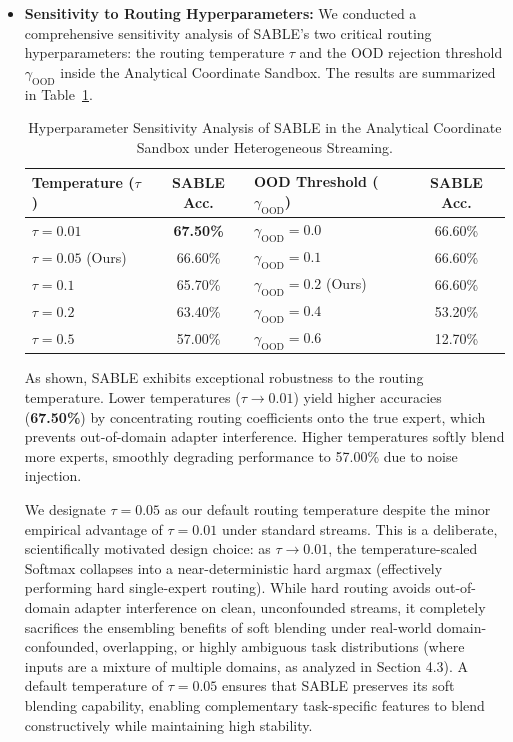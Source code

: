 \begin{itemize}
    \item \textbf{Sensitivity to Routing Hyperparameters:} We conducted a comprehensive sensitivity analysis of SABLE's two critical routing hyperparameters: the routing temperature $\tau$ and the OOD rejection threshold $\gamma_{\text{OOD}}$ inside the Analytical Coordinate Sandbox. The results are summarized in Table~\ref{tab:sensitivity_analysis}.
    
    \begin{table}[htbp]
    \caption{Hyperparameter Sensitivity Analysis of SABLE in the Analytical Coordinate Sandbox under Heterogeneous Streaming.}
    \label{tab:sensitivity_analysis}
    \vskip 0.1in
    \begin{center}
    \begin{small}
    \begin{sc}
    \begin{tabular}{lc|lc}
    \toprule
    Temperature ($\tau$) & SABLE Acc. & OOD Threshold ($\gamma_{\text{OOD}}$) & SABLE Acc. \\
    \midrule
    $\tau=0.01$ & \textbf{67.50\%} & $\gamma_{\text{OOD}}=0.0$ & 66.60\% \\
    $\tau=0.05$ (Ours) & 66.60\% & $\gamma_{\text{OOD}}=0.1$ & 66.60\% \\
    $\tau=0.1$ & 65.70\% & $\gamma_{\text{OOD}}=0.2$ (Ours) & 66.60\% \\
    $\tau=0.2$ & 63.40\% & $\gamma_{\text{OOD}}=0.4$ & 53.20\% \\
    $\tau=0.5$ & 57.00\% & $\gamma_{\text{OOD}}=0.6$ & 12.70\% \\
    \bottomrule
    \end{tabular}
    \end{sc}
    \end{small}
    \end{center}
    \vskip -0.1in
    \end{table}
    
    As shown, SABLE exhibits exceptional robustness to the routing temperature. Lower temperatures ($\tau \to 0.01$) yield higher accuracies (\textbf{67.50\%}) by concentrating routing coefficients onto the true expert, which prevents out-of-domain adapter interference. Higher temperatures softly blend more experts, smoothly degrading performance to 57.00\% due to noise injection. 

    We designate $\tau = 0.05$ as our default routing temperature despite the minor empirical advantage of $\tau = 0.01$ under standard streams. This is a deliberate, scientifically motivated design choice: as $\tau \to 0.01$, the temperature-scaled Softmax collapses into a near-deterministic hard argmax (effectively performing hard single-expert routing). While hard routing avoids out-of-domain adapter interference on clean, unconfounded streams, it completely sacrifices the ensembling benefits of soft blending under real-world domain-confounded, overlapping, or highly ambiguous task distributions (where inputs are a mixture of multiple domains, as analyzed in Section 4.3). A default temperature of $\tau = 0.05$ ensures that SABLE preserves its soft blending capability, enabling complementary task-specific features to blend constructively while maintaining high stability.


\end{itemize}

